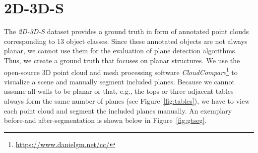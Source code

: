 \documentclass[main.tex]{subfiles}
\begin{document}
\section{2D-3D-S}
\label{sec:gtseg}
The \textit{2D-3D-S} dataset provides a ground truth in form of annotated point clouds corresponding to 13 object classes. Since these annotated objects are not
always planar, we cannot use them for the evaluation of plane detection algorithms. Thus, we create a ground truth that focuses on planar structures.
We use the open-source 3D point cloud and mesh processing software \textit{CloudCompare}\footnote{\href{https://www.danielgm.net/cc/}{https://www.danielgm.net/cc/}} to visualize a scene and manually segment included planes.
Because we cannot assume all walls to be planar or that, e.g., the tops or three adjacent tables always form the same number of planes (see Figure~\ref{fig:tables}), we
have to view each point cloud and segment the included planes manually. An exemplary before-and after-segmentation is shown below in Figure~\ref{fig:gtseg}.
\end{document}
